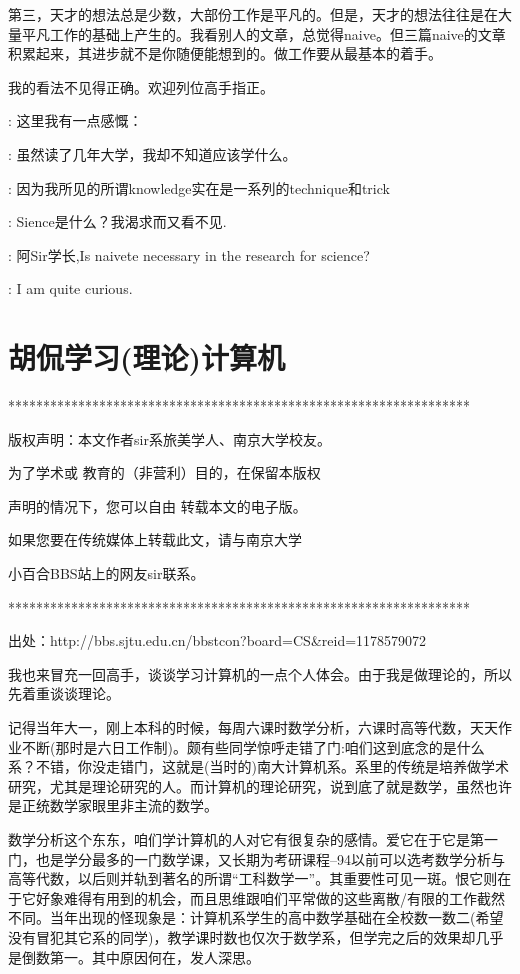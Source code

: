 第三，天才的想法总是少数，大部份工作是平凡的。但是，天才的想法往往是在大量平凡工作的基础上产生的。我看别人的文章，总觉得naive。但三篇naive的文章积累起来，其进步就不是你随便能想到的。做工作要从最基本的着手。

我的看法不见得正确。欢迎列位高手指正。



: 这里我有一点感慨：

: 虽然读了几年大学，我却不知道应该学什么。

: 因为我所见的所谓knowledge实在是一系列的technique和trick

: Sience是什么？我渴求而又看不见.

: 阿Sir学长,Is naivete necessary in the research for science?

: I am quite curious.

\chapter{胡侃学习(理论)计算机}


******************************************************************  

版权声明：本文作者sir系旅美学人、南京大学校友。 

为了学术或 教育的（非营利）目的，在保留本版权

声明的情况下，您可以自由 转载本文的电子版。

如果您要在传统媒体上转载此文，请与南京大学

小百合BBS站上的网友sir联系。 

****************************************************************** 

出处：http://bbs.sjtu.edu.cn/bbstcon?board=CS\&reid=1178579072


我也来冒充一回高手，谈谈学习计算机的一点个人体会。由于我是做理论的，所以先着重谈谈理论。 

记得当年大一，刚上本科的时候，每周六课时数学分析，六课时高等代数，天天作业不断(那时是六日工作制)。颇有些同学惊呼走错了门:咱们这到底念的是什么系？不错，你没走错门，这就是(当时的)南大计算机系。系里的传统是培养做学术研究，尤其是理论研究的人。而计算机的理论研究，说到底了就是数学，虽然也许是正统数学家眼里非主流的数学。 

数学分析这个东东，咱们学计算机的人对它有很复杂的感情。爱它在于它是第一门，也是学分最多的一门数学课，又长期为考研课程--94以前可以选考数学分析与高等代数，以后则并轨到著名的所谓“工科数学一”。其重要性可见一斑。恨它则在于它好象难得有用到的机会，而且思维跟咱们平常做的这些离散/有限的工作截然不同。当年出现的怪现象是：计算机系学生的高中数学基础在全校数一数二(希望没有冒犯其它系的同学)，教学课时数也仅次于数学系，但学完之后的效果却几乎是倒数第一。其中原因何在，发人深思。 


